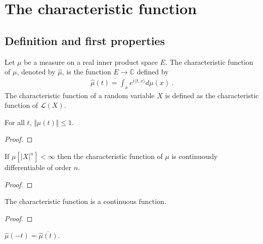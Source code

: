 \chapter{The characteristic function}

\section{Definition and first properties}

\begin{definition}\label{def:charFun}
 \mathlibok
Let $\mu$ be a measure on a real inner product space $E$. The characteristic function of $\mu$, denoted by $\hat{\mu}$, is the function $E \to \mathbb{C}$ defined by
\begin{align*}
\hat{\mu}(t) = \int_x e^{i \langle t, x \rangle} d\mu(x) \: .
\end{align*}
The characteristic function of a random variable $X$ is defined as the characteristic function of $\mathcal L(X)$.
\end{definition}


\begin{lemma}\label{lem:charFun_bounded}
 \mathlibok
{}
For all $t$, $\Vert\hat{\mu}(t)\Vert \le 1$.
\end{lemma}

\begin{proof}\leanok
\end{proof}


\begin{lemma}\label{lem:charFun_contDiff}
\leanok
{}
If $\mu[|X|^n] < \infty$ then the characteristic function of $\mu$ is continuously differentiable of order $n$.
\end{lemma}

\begin{proof}\leanok
\end{proof}


\begin{lemma}\label{lem:charFun_continuous}
\leanok
{}
The characteristic function is a continuous function.
\end{lemma}

\begin{proof}\leanok
{}
\end{proof}


\begin{lemma}\label{lem:charFun_neg}
 \mathlibok
{}
$\hat{\mu}(-t) = \overline{\hat{\mu}(t)}$.
\end{lemma}

